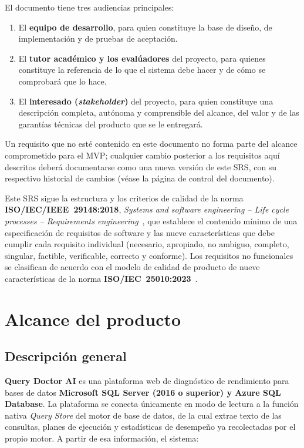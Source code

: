 \documentclass[11pt,a4paper]{report}
\begin{document}
El documento tiene tres audiencias principales:

\begin{enumerate}[label=\alph*)]
\item El \textbf{equipo de desarrollo}, para quien constituye la base de dise\~no, de implementaci\'on y de pruebas de aceptaci\'on.
\item El \textbf{tutor acad\'emico y los eval\'uadores} del proyecto, para quienes constituye la referencia de lo que el sistema debe hacer y de c\'omo se comprobar\'a que lo hace.
\item El \textbf{interesado (\textit{stakeholder})} del proyecto, para quien constituye una descripci\'on completa, aut\'onoma y comprensible del alcance, del valor y de las garant\'ias t\'ecnicas del producto que se le entregar\'a.
\end{enumerate}

Un requisito que no est\'e contenido en este documento no forma parte del alcance comprometido para el MVP; cualquier cambio posterior a los requisitos aqu\'i descritos deber\'a documentarse como una nueva versi\'on de este SRS, con su respectivo historial de cambios (v\'ease la p\'agina de control del documento).

Este SRS sigue la estructura y los criterios de calidad de la norma \textbf{ISO/IEC/IEEE~29148:2018}, \textit{Systems and software engineering -- Life cycle processes -- Requirements engineering}~\cite{R1}, que establece el contenido m\'inimo de una especificaci\'on de requisitos de software y las nueve caracter\'isticas que debe cumplir cada requisito individual (necesario, apropiado, no ambiguo, completo, singular, factible, verificable, correcto y conforme). Los requisitos no funcionales se clasifican de acuerdo con el modelo de calidad de producto de nueve caracter\'isticas de la norma \textbf{ISO/IEC~25010:2023}~\cite{R2}.

\section{Alcance del producto}

\subsection{Descripci\'on general}

\textbf{Query Doctor AI} es una plataforma web de diagn\'ostico de rendimiento para bases de datos \textbf{Microsoft SQL Server (2016 o superior) y Azure SQL Database}. La plataforma se conecta \'unicamente en modo de lectura a la funci\'on nativa \textit{Query Store} del motor de base de datos, de la cual extrae texto de las consultas, planes de ejecuci\'on y estad\'isticas de desempe\~no ya recolectadas por el propio motor. A partir de esa informaci\'on, el sistema:
\end{document}
